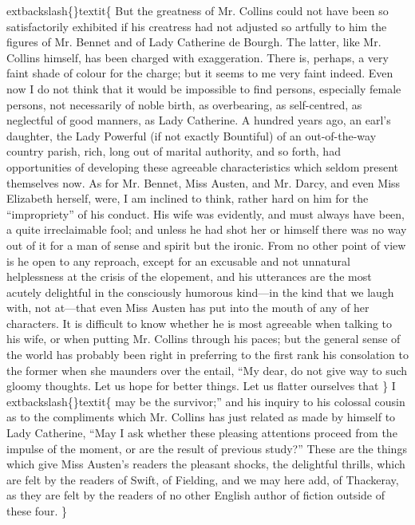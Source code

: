 \documentclass[10pt]{book}
\begin{document}
	extbackslash\{\}textit\{
    But the greatness of Mr. Collins could not have been so satisfactorily
exhibited if his creatress had not adjusted so artfully to him the
figures of Mr. Bennet and of Lady Catherine de Bourgh. The latter, like
Mr. Collins himself, has been charged with exaggeration. There is,
perhaps, a very faint shade of colour for the charge; but it seems to me
very faint indeed. Even now I do not think that it would be impossible
to find persons, especially female persons, not necessarily of noble
birth, as overbearing, as
    self-centred, as neglectful of good manners,
as Lady Catherine. A hundred years ago, an earl’s daughter, the Lady
Powerful (if not exactly Bountiful) of an out-of-the-way country parish,
rich, long out of marital authority, and so forth, had opportunities of
developing these agreeable characteristics which seldom present
themselves now. As for Mr. Bennet, Miss Austen, and Mr. Darcy, and even
Miss Elizabeth herself, were, I am inclined to think, rather hard on him
for the “impropriety” of his conduct. His wife was evidently, and must
always have been, a quite irreclaimable fool; and unless he had shot her
or himself there was no way out of it for a man of sense and spirit but
the ironic. From no other point of view is he open to any reproach,
except for an excusable and not unnatural helplessness at the crisis of
the elopement, and his utterances are the most acutely delightful in the
consciously humorous kind—in the kind that we laugh with, not at—that
even Miss Austen has put into the mouth of any of her characters. It is
difficult to know whether he is most agreeable when talking to his wife,
or when putting Mr. Collins through his paces; but the general sense of
the world has probably been right in preferring to the first rank his
consolation to the former when she maunders over the entail, “My dear,
do not give way to such gloomy thoughts. Let us hope for better things.
Let us flatter ourselves that
   \}
   I
   	extbackslash\{\}textit\{
    may be the survivor;” and his inquiry
to his colossal cousin as to the compliments which Mr. Collins has just
related as made by himself to Lady Catherine, “May I ask whether these
pleasing attentions proceed from the impulse of the moment,
    or are the
result of previous study?” These are the things which give Miss Austen’s
readers the pleasant shocks, the delightful thrills, which are felt by
the readers of Swift, of Fielding, and we may here add, of Thackeray, as
they are felt by the readers of no other English author of fiction
outside of these four.
   \}
\end{document}
